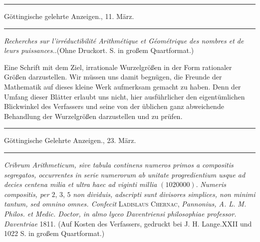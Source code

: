 \clearpage
{}
\thispagestyle{empty}
\begin{center}
\vspace*{1in}{\Large BESPRECHUNGEN\par}
\vspace{.4in}{\large FREMDER\par}
\vspace{.4in}{\Large SCHRIFTEN.\par}
\end{center}

\clearpage
{}
\renewcommand{\BookRunningTitle}{Besprechungen fremder Schriften}
\begin{center}
\rule{.86\linewidth}{.3pt}\par
Göttingische gelehrte Anzeigen., 11. März.\par
\rule{.86\linewidth}{.3pt}
\end{center}
\begin{center}
\emph{Recherches sur l'irréductibilité Arithmétique et Géométrique des nombres et de leurs puissances.}.\quad (Ohne Druckort. S. in großem Quartformat.)
\end{center}

Eine Schrift mit dem Ziel, irrationale Wurzelgrößen in der Form rationaler Größen darzustellen. Wir müssen uns damit begnügen, die Freunde der Mathematik auf dieses kleine Werk aufmerksam gemacht zu haben. Denn der Umfang dieser Blätter erlaubt uns nicht, hier ausführlicher den eigentümlichen Blickwinkel des Verfassers und seine von der üblichen ganz abweichende Behandlung der Wurzelgrößen darzustellen und zu prüfen.

\begin{center}
\rule{.86\linewidth}{.3pt}\par
Göttingische Gelehrte Anzeigen., 23. März.\par
\rule{.86\linewidth}{.3pt}
\end{center}
\emph{Cribrum Arithmeticum, sive tabula continens numeros primos a compositis segregatos, occurrentes in serie numerorum ab unitate progredientium usque ad decies centena milia et ultra haec ad viginti millia} $(1020000)$. \emph{Numeris compositis, per} $2$, $3$, $5$ \emph{non dividuis, adscripti sunt divisores simplices, non minimi tantum, sed omnino}
\emph{omnes. Confecit} \textsc{Ladislaus Chernac}, \emph{Pannonius, A. L. M. Philos. et Medic. Doctor, in almo lyceo Daventriensi philosophiae professor. Daventriae} 1811. (Auf Kosten des Verfassers, gedruckt bei J. H. Lange.\quad XXII und 1022 S. in großem Quartformat.)


